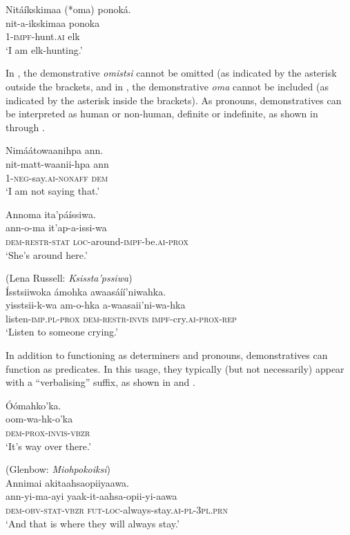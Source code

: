 \documentclass[output=paper,colorlinks,citecolor=brown]{langscibook}
\begin{document}
\ea\label{ex:bliss:3} {Nitáíkskimaa (*oma) ponoká.}\\
\gll nit-a-ikskimaa ponoka\\
     1-\textsc{impf}-hunt.\textsc{ai} elk\\
\glt ‘I am elk-hunting.’
\z

In , the demonstrative \textit{omistsi} cannot be omitted (as indicated by the asterisk outside the brackets, and in , the demonstrative \textit{oma} cannot be included (as indicated by the asterisk inside the brackets). As pronouns, demonstratives can be interpreted as human or non-human, definite or indefinite, as shown in  through .

\ea\label{ex:bliss:4} {Nimáátowaanihpa ann.}\\
\gll nit-matt-waanii-hpa ann\\
    1-\textsc{neg}-say.\textsc{ai-nonaff} \textsc{dem}\\
\glt ‘I am not saying that.’
\z

\ea\label{ex:bliss:5} {Annoma ita’páíssiwa.}\\
\gll ann-o-ma it’ap-a-issi-wa\\
    \textsc{dem-restr-stat} \textsc{loc}-around-\textsc{impf}-be.\textsc{ai-prox}\\
\glt ‘She’s around here.’
\z

\ea\label{ex:bliss:6} (Lena Russell: \textit{Ksissta’pssiwa}) \\
{Ísstsiiwoka ámohka awaasáíí’niwahka.}\\
\gll yisstsii-k-wa am-o-hka a-waasaii’ni-wa-hka\\
  listen-\textsc{imp.pl-prox} \textsc{dem-restr-invis} \textsc{impf}-cry.\textsc{ai-prox-rep}\\
\glt ‘Listen to someone crying.’ 
\z

In addition to functioning as determiners and pronouns, demonstratives can function as predicates. In this usage, they typically (but not necessarily) appear with a “verbalising” suffix, as shown in  and .

\ea\label{ex:bliss:7} {Óómahko’ka.}\\
\gll oom-wa-hk-o’ka\\
     \textsc{dem-prox-invis-vbzr}\\
\glt ‘It’s way over there.’
\z

\ea\label{ex:bliss:8} (Glenbow: \textit{Miohpokoiksi})\\
{Annimai akitaahsaopiiyaawa.}\\
\gll ann-yi-ma-ayi yaak-it-aahsa-opii-yi-aawa\\
     \textsc{dem-obv-stat-vbzr} \textsc{fut-loc}-always-stay.\textsc{ai-pl-3pl.prn}\\
\glt ‘And that is where they will always stay.’ 
\z
\end{document}
